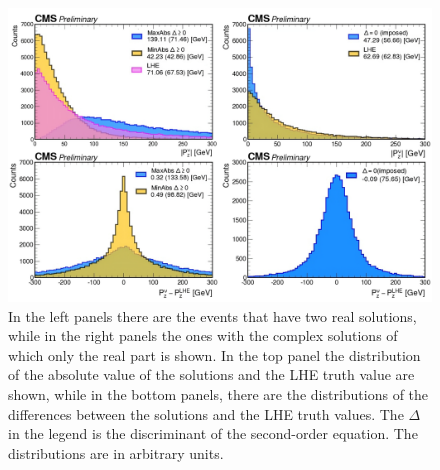 \begin{figure}[H]
    \centering
    \includegraphics[width=1\linewidth]{fig//chap07-selection/Pznu_LHE_comparison.png}
    \caption{In the left panels there are the events that have two real solutions, while in the right panels the ones with the complex solutions of which only the real part is shown. In the top panel the distribution of the absolute value of the solutions and the LHE truth value are shown, while in the bottom panels, there are the distributions of the differences between the solutions and the LHE truth values. The $\Delta$ in the legend is the discriminant of the second-order equation. The distributions are in arbitrary units.}
    \label{fig:nu_comparison}
\end{figure}




